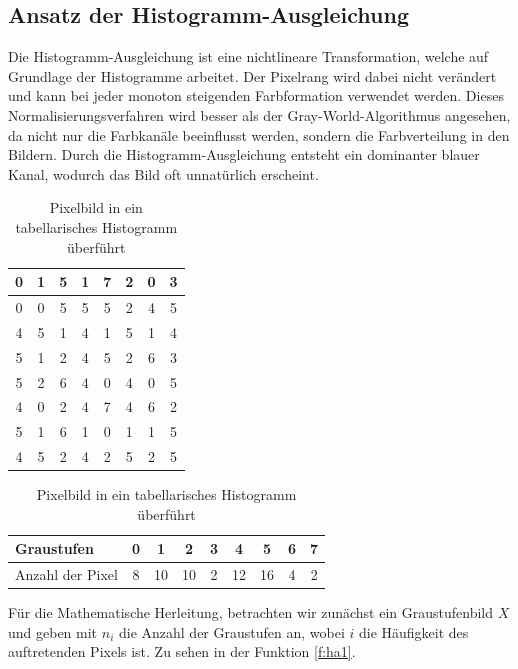   \subsection{Ansatz der Histogramm-Ausgleichung}\label{s.ha}  
Die Histogramm-Ausgleichung \cite{goatman2003colour} ist eine nichtlineare Transformation, welche auf Grundlage der Histogramme arbeitet. Der Pixelrang wird dabei nicht verändert und kann bei jeder monoton steigenden Farbformation verwendet werden. Dieses Normalisierungsverfahren wird besser als der Gray-World-Algorithmus angesehen, da nicht nur die Farbkanäle beeinflusst werden, sondern die Farbverteilung in den Bildern. Durch die Histogramm-Ausgleichung entsteht ein dominanter blauer Kanal, wodurch das Bild oft unnatürlich erscheint.
   \begin{table}
  [h]
  \centering
  \caption{Pixelbild in ein tabellarisches Histogramm überführt}
  \label{tab:bildha}
  \begin{minipage}{\textwidth}
  \center
  \begin{tabular}{|c|c|c|c|c|c|c|c|}
  \hline
  0&1&5&1&7&2&0&3\\
  \hline
  0&0&5&5&5&2&4&5\\
  \hline
  4&5&1&4&1&5&1&4\\
  \hline
  5&1&2&4&5&2&6&3\\
  \hline
  5&2&6&4&0&4&0&5\\
  \hline
  4&0&2&4&7&4&6&2\\
  \hline
  5&1&6&1&0&1&1&5\\
  \hline
  4&5&2&4&2&5&2&5\\
  \hline
  \end{tabular}
  \end{minipage}
  \begin{minipage}{\textwidth}
  \hspace{\textwidth}
  \end{minipage}
  \begin{minipage}{\textwidth}
  \center
  \begin{tabular}{|l|c|c|c|c|c|c|c|c|}
  \hline
  Graustufen & 0 & 1 & 2 & 3 & 4 & 5 & 6 & 7\\
  \hline
  Anzahl der Pixel & 8 & 10 & 10 & 2 & 12 & 16 & 4 & 2\\
  \hline
  \end{tabular}
  \end{minipage}
  \end{table}
Für die Mathematische Herleitung, betrachten wir zunächst ein Graustufenbild $X$ und geben mit $n_{i}$ die Anzahl der Graustufen an, wobei $i$ die Häufigkeit des auftretenden Pixels ist. Zu sehen in der Funktion \ref{f:ha1}.
